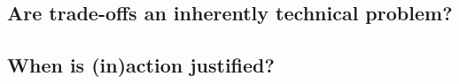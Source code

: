 
\subsection{Are trade-offs an inherently technical problem?}

\subsection{When is (in)action justified?}
